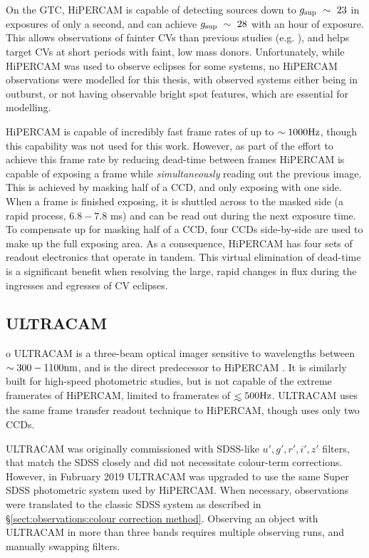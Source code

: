 On the GTC, HiPERCAM is capable of detecting sources down to $g_{\rm sup}~\sim~23$ in exposures of only a second, and can achieve $g_{\rm sup}~\sim~28$ with an hour of exposure. This allows observations of fainter CVs than previous studies (e.g. \citealt{McallisterThesis}), and helps target CVs at short periods with faint, low mass donors.
Unfortunately, while HiPERCAM was used to observe eclipses for some systems, no HiPERCAM observations were modelled for this thesis, with observed systems either being in outburst, or not having observable bright spot features, which are essential for modelling.

HiPERCAM is capable of incredibly fast frame rates of up to $\sim 1000 \rm Hz$, though this capability was not used for this work.
However, as part of the effort to achieve this frame rate by reducing dead-time between frames HiPERCAM is capable of exposing a frame while {\it simultaneously} reading out the previous image.
This is achieved by masking half of a CCD, and only exposing with one side. When a frame is finished exposing, it is shuttled across to the masked side (a rapid process, $6.8 - 7.8$ ms) and can be read out during the next exposure time. To compensate up for masking half of a CCD, four CCDs side-by-side are used to make up the full exposing area. As a consequence, HiPERCAM has four sets of readout electronics that operate in tandem.
This virtual elimination of dead-time is a significant benefit when resolving the large, rapid changes in flux during the ingresses and egresses of CV eclipses.



\subsection{ULTRACAM}
\label{sect:observations:ultracam}
o
ULTRACAM is a three-beam optical imager sensitive to wavelengths between $\sim 300 - 1100 \rm nm$, and is the direct predecessor to HiPERCAM \citep{dhillon2007}.
It is similarly built for high-speed photometric studies, but is not capable of the extreme framerates of HiPERCAM, limited to framerates of $\lesssim 500 \rm Hz$.
ULTRACAM uses the same frame transfer readout technique to HiPERCAM, though uses only two CCDs.

ULTRACAM was originally commissioned with SDSS-like $u',g',r',i',z'$ filters, that match the SDSS closely and did not necessitate colour-term corrections. However, in Fubruary 2019 ULTRACAM was upgraded to use the same Super SDSS photometric system used by HiPERCAM. When necessary, observations were translated to the classic SDSS system as described in \S\ref{sect:observations:colour correction method}.
Observing an object with ULTRACAM in more than three bands requires multiple observing runs, and manually swapping filters.


